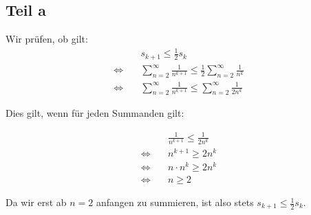 \documentclass[a4paper,german,12pt,smallheadings]{scrartcl}
\begin{document}
\subsection*{Teil a}

Wir prüfen, ob gilt:
\begin{align*}
  &s_{k+1} \le \frac{1}{2}s_k \\
  \Leftrightarrow\quad&\sum_{n=2}^{\infty} \frac{1}{n^{k+1}} \le \frac{1}{2} \sum_{n=2}^{\infty} \frac{1}{n^k} \\
  \Leftrightarrow\quad&\sum_{n=2}^{\infty} \frac{1}{n^{k+1}} \le \sum_{n=2}^{\infty} \frac{1}{2n^k}
\end{align*}

Dies gilt, wenn für jeden Summanden gilt:

\begin{align*}
  &\frac{1}{n^{k+1}} \le \frac{1}{2n^k} \\
  \Leftrightarrow\quad& n^{k+1} \ge 2n^k \\
  \Leftrightarrow\quad& n \cdot n^{k} \ge 2n^k \\
  \Leftrightarrow\quad& n \ge 2
\end{align*}

Da wir erst ab $n=2$ anfangen zu summieren, ist also stets $s_{k+1} \le \frac{1}{2}s_k$.
\end{document}
